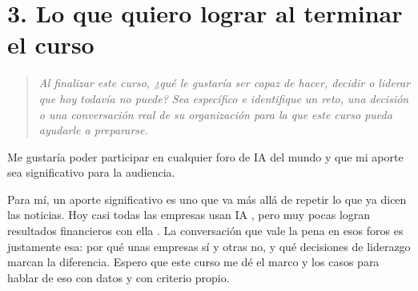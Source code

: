 \documentclass[11pt,letterpaper]{article}
\newcommand{\pregunta}[1]{%
  \begin{quote}\color{cGris}\small\itshape #1\end{quote}}
\begin{document}
\section*{3. Lo que quiero lograr al terminar el curso}

\pregunta{Al finalizar este curso, ¿qué le gustaría ser capaz de hacer, decidir
o liderar que hoy todavía no puede? Sea específico e identifique un reto, una
decisión o una conversación real de su organización para la que este curso
pueda ayudarle a prepararse.}

Me gustaría poder participar en cualquier foro de IA del mundo y que mi aporte
sea significativo para la audiencia.

Para mí, un aporte significativo es uno que va más allá de repetir lo que ya
dicen las noticias. Hoy casi todas las empresas usan IA \parencite{mckinsey2025},
pero muy pocas logran resultados financieros con ella \parencite{ransbotham2020}.
La conversación que vale la pena en esos foros es justamente esa: por qué
unas empresas sí y otras no, y qué decisiones de liderazgo marcan la
diferencia. Espero que este curso me dé el marco y los casos para hablar de
eso con datos y con criterio propio.

\printbibliography[title={Referencias}]
\end{document}
